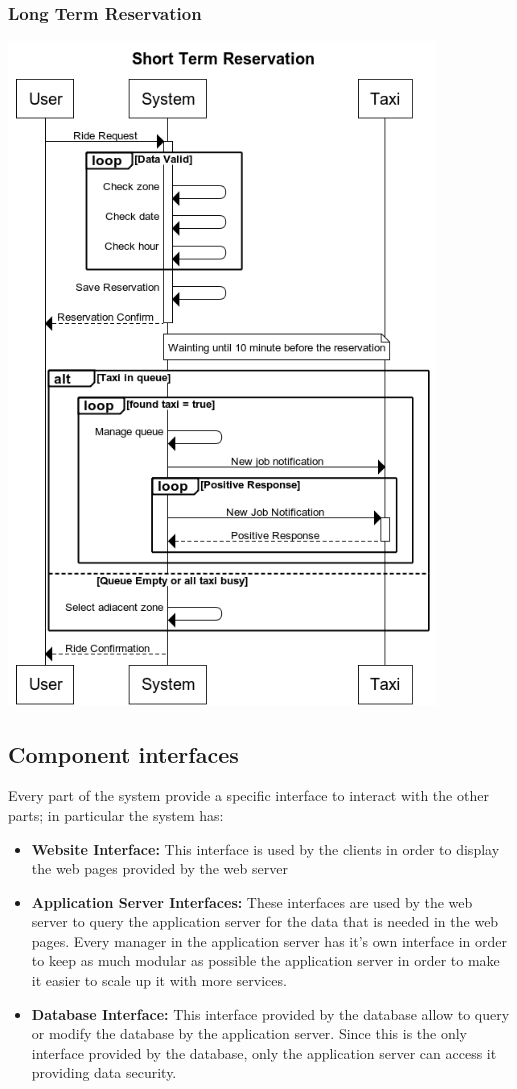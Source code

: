 	\subsubsection{Long Term Reservation}
		\begin{center}
			\includegraphics[width=0.85\textwidth]{./images/Long_Term_Reservation_Complete.png}
		\end{center}
\subsection{Component interfaces}
	Every part of the system provide a specific interface to interact with the other parts; in particular the system has:
	\begin{itemize}
		\item \textbf{Website Interface:} This interface is used by the clients in order to display the web pages provided by the web server
		\item \textbf{Application Server Interfaces:} These interfaces are used by the web server to query the application server for the data that is needed in the web pages. Every manager in the application server has it's own interface in order to keep as much modular as possible the application server in order to make it easier to scale up it with more services.
		\item \textbf{Database Interface:} This interface provided by the database allow to query or modify the database by the application server. Since this is the only interface provided by the database, only the application server can access it providing data security. 
	\end{itemize}
